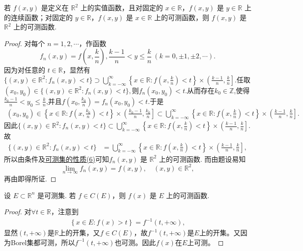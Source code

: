 \documentclass[../../main.tex]{subfiles}%
\begin{document}
\begin{proposition}
若 \(f(x,y)\) 是定义在 \(\mathbb{R}^2\) 上的实值函数，且对固定的 \(x \in \mathbb{R}\)，\(f(x,y)\) 是 \(y \in \mathbb{R}\) 上的连续函数；对固定的 \(y \in \mathbb{R}\)，\(f(x,y)\) 是 \(x \in \mathbb{R}\) 上的可测函数，则 \(f(x,y)\) 是 \(\mathbb{R}^2\) 上的可测函数.
\end{proposition}
\begin{proof}

对每个 \(n = 1,2,\cdots\)，作函数
\[
f_n(x,y) = f\left(x,\frac{k}{n}\right), \frac{k - 1}{n} < y \leqslant \frac{k}{n} \ (k = 0, \pm 1, \pm 2,\cdots).
\]
因为对任意的 \(t \in \mathbb{R}\)，显然有$\{(x,y) \in \mathbb{R}^2: f_n(x,y) < t\} 
\supset \bigcup_{k = -\infty}^{\infty}\left\{x \in \mathbb{R}: f\left(x,\frac{k}{n}\right) < t\right\} \times \left(\frac{k - 1}{n}, \frac{k}{n}\right].$任取$(x_0,y_0)\in \{(x,y) \in \mathbb{R}^2: f_n(x,y) < t\},$则$f_n(x_0,y_0)<t$.从而存在$k_0\in \mathbb{Z}$,使得$\frac{k_0-1}{n}<y_0 \leqslant  \frac{k}{n}$,并且$f(x_0,\frac{k_0}{n})=f_n(x_0,y_0)<t$.于是
\begin{align*}
(x_0,y_0)\in\left\{x \in \mathbb{R}: f\left(x,\frac{k_0}{n}\right) < t\right\} \times \left(\frac{k_0 - 1}{n}, \frac{k_0}{n}\right] \subset \bigcup_{k = -\infty}^{\infty}\left\{x \in \mathbb{R}: f\left(x,\frac{k}{n}\right) < t\right\} \times \left(\frac{k - 1}{n}, \frac{k}{n}\right].
\end{align*}
因此$\{(x,y) \in \mathbb{R}^2: f_n(x,y) < t\} 
\subset \bigcup_{k = -\infty}^{\infty}\left\{x \in \mathbb{R}: f\left(x,\frac{k}{n}\right) < t\right\} \times \left(\frac{k - 1}{n}, \frac{k}{n}\right].$
故
\begin{align*}
\{(x,y) \in \mathbb{R}^2: f_n(x,y) < t\} 
&= \bigcup_{k = -\infty}^{\infty}\left\{x \in \mathbb{R}: f\left(x,\frac{k}{n}\right) < t\right\} \times \left(\frac{k - 1}{n}, \frac{k}{n}\right],
\end{align*}
所以由条件及\hyperref[theorem:可测集的性质]{可测集的性质(6)}可知\(f_n(x,y)\) 是 \(\mathbb{R}^2\) 上的可测函数. 而由题设易知
\[
\lim_{n \to \infty}f_n(x,y) = f(x,y), \quad (x,y) \in \mathbb{R}^2,
\]
再由即得所证.

\end{proof}

\begin{proposition}[连续函数必可测]\label{proposition:连续函数必可测}
设 \(E \subset \mathbb{R}^n\) 是可测集. 若 \(f \in C(E)\)，则 \(f(x)\) 是 \(E\) 上的可测函数. 
\end{proposition}
\begin{proof}

对$\forall t\in \mathbb{R}$，注意到
\begin{align*}
\left\{ x\in E:f\left( x \right) >t \right\} =f^{-1}\left( t,+\infty \right) ,
\end{align*}
显然$\left( t,+\infty \right)$是$\mathbb{R}$上的开集，又$f\in C\left( E \right)$，故$f^{-1}\left( t,+\infty \right)$是$E$上的开集。又因为Borel集都可测，所以$f^{-1}\left( t,+\infty \right)$也可测。因此$f\left( x \right)$在$E$上可测。

\end{proof}
\end{document}
